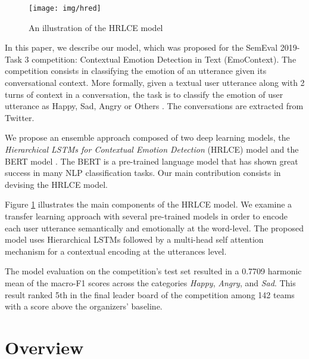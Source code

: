 \documentclass[11pt,a4paper]{article}
\begin{document}
\begin{figure}[h!]
    \centering
    \texttt{[image: img/hred]}
    \caption[An illustration of the HRLCE model] {An illustration of the HRLCE model}
    \label{fig:high_level_model}
\end{figure}

In this paper, we describe our model, which was proposed for the SemEval 2019-Task 3 competition: Contextual Emotion Detection in Text (EmoContext). The competition consists in classifying the emotion of an utterance given its conversational context. More formally, given a textual user utterance along with 2 turns of context in a conversation, the task is to classify the emotion of user utterance as Happy, Sad, Angry or Others \cite{SemEval2019Task3}. The conversations are extracted from Twitter.

We propose an ensemble approach composed of two 
deep learning models, 
the \emph{Hierarchical LSTMs for Contextual Emotion Detection} (HRLCE) model and the BERT model \cite{devlin2018bert}. The BERT is a pre-trained language model that has shown great success in many NLP classification tasks. Our main contribution consists in devising the HRLCE model.



Figure \ref{fig:high_level_model} illustrates the main components of 
the HRLCE model.
We examine a transfer learning approach with several pre-trained models in order to encode each user utterance 
semantically and emotionally at the word-level. 
The proposed model uses Hierarchical LSTMs \cite{sordoni2015hierarchical} followed by a multi-head self attention mechanism \cite{vaswani2017attention} 
for a contextual encoding at the utterances level.




The model evaluation on the competition's test set resulted in a 0.7709 harmonic mean of the macro-F1 scores across the categories \emph{Happy}, \emph{Angry}, and \emph{Sad}. This result ranked 5th in the final leader board of the competition among 142 teams 
with a score above 
the organizers' baseline.













\section{Overview}
\end{document}

